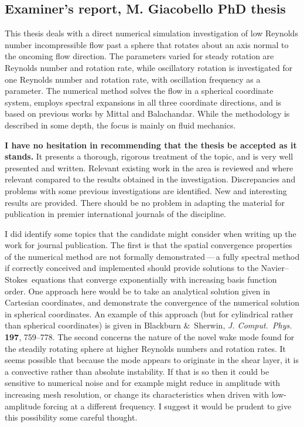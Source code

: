 \documentclass[a4paper,12pt]		{article}
\newcommand\NavSto{Navier--Stokes}
\begin{document}
\subsection*{Examiner's report, M. Giacobello PhD thesis}

This thesis deals with a direct numerical simulation investigation of
low Reynolds number incompressible flow past a sphere that rotates
about an axis normal to the oncoming flow direction. The parameters
varied for steady rotation are Reynolds number and rotation rate,
while oscillatory rotation is investigated for one Reynolds number and
rotation rate, with oscillation frequency as a parameter. The
numerical method solves the flow in a spherical coordinate system,
employs spectral expansions in all three coordinate directions, and is
based on previous works by Mittal and Balachandar. While the
methodology is described in some depth, the focus is mainly on fluid
mechanics.

\textbf{I have no hesitation in recommending that the thesis be
accepted as it stands.} It presents a thorough, rigorous treatment of
the topic, and is very well presented and written. Relevant existing
work in the area is reviewed and where relevant compared to the
results obtained in the investigation. Discrepancies and problems with
some previous investigations are identified. New and interesting
results are provided. There should be no problem in adapting the
material for publication in premier international journals of the
discipline.

I did identify some topics that the candidate might consider when
writing up the work for journal publication. The first is that the
spatial convergence properties of the numerical method are not
formally demonstrated\,---\,a fully spectral method if correctly
conceived and implemented should provide solutions to the \NavSto\
equations that converge exponentially with increasing basis function
order. One approach here would be to take an analytical solution given
in Cartesian coordinates, and demonstrate the convergence of the
numerical solution in spherical coordinates. An example of this
approach (but for cylindrical rather than spherical coordinates) is
given in Blackburn \&~Sherwin, \textsl{J. Comput.\ Phys.}\/
\textbf{197}, 759--778. The second concerns the nature of the novel
wake mode found for the steadily rotating sphere at higher Reynolds
numbers and rotation rates. It seems possible that because the mode
appears to originate in the shear layer, it is a convective rather
than absolute instability. If that is so then it could be sensitive to
numerical noise and for example might reduce in amplitude with
increasing mesh resolution, or change its characteristics when driven
with low-amplitude forcing at a different frequency. I suggest it
would be prudent to give this possibility some careful thought.

\end{document}
